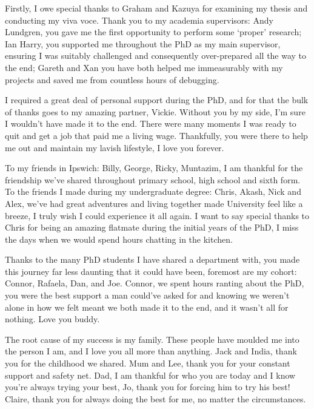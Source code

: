 
Firstly, I owe special thanks to Graham and Kazuya for examining my thesis and conducting my viva voce.
%
Thank you to my academia supervisors: Andy Lundgren, you gave me the first opportunity to perform some `proper' research; Ian Harry, you supported me throughout the PhD as my main supervisor, ensuring I was suitably challenged and consequently over-prepared all the way to the end; Gareth and Xan you have both helped me immeasurably with my projects and saved me from countless hours of debugging.

I required a great deal of personal support during the PhD, and for that the bulk of thanks goes to my amazing partner, Vickie. Without you by my side, I'm sure I wouldn't have made it to the end. There were many moments I was ready to quit and get a job that paid me a living wage. Thankfully, you were there to help me out and maintain my lavish lifestyle, I love you forever. 

To my friends in Ipswich: Billy, George, Ricky, Muntazim, I am thankful for the friendship we've shared throughout primary school, high school and sixth form. To the friends I made during my undergraduate degree: Chris, Akash, Nick and Alex, we've had great adventures and living together made University feel like a breeze, I truly wish I could experience it all again. I want to say special thanks to Chris for being an amazing flatmate during the initial years of the PhD, I miss the days when we would spend hours chatting in the kitchen.

Thanks to the many PhD students I have shared a department with, you made this journey far less daunting that it could have been, foremost are my cohort: Connor, Rafaela, Dan, and Joe. Connor, we spent hours ranting about the PhD, you were the best support a man could've asked for and knowing we weren't alone in how we felt meant we both made it to the end, and it wasn't all for nothing. Love you buddy.

The root cause of my success is my family. These people have moulded me into the person I am, and I love you all more than anything. Jack and India, thank you for the childhood we shared. Mum and Lee, thank you for your constant support and safety net. Dad, I am thankful for who you are today and I know you're always trying your best, Jo, thank you for forcing him to try his best! Claire, thank you for always doing the best for me, no matter the circumstances.
